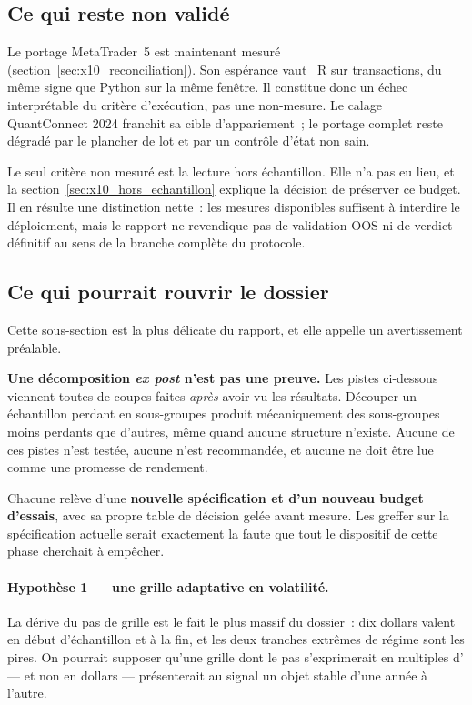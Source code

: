 \subsection{Ce qui reste non validé}

Le portage MetaTrader~5 est maintenant mesuré
(section~\ref{sec:x10_reconciliation}). Son espérance vaut
\XTenMTFiveExpectancyR{}~R sur \XTenMTFiveTrades{} transactions, du même signe
que Python sur la même fenêtre. Il constitue donc un échec interprétable du
critère d'exécution, pas une non-mesure. Le calage QuantConnect 2024 franchit
sa cible d'appariement~; le portage complet reste dégradé par le plancher de
lot et par un contrôle d'état non sain.

Le seul critère non mesuré est la lecture hors échantillon. Elle n'a pas eu
lieu, et la section~\ref{sec:x10_hors_echantillon} explique la décision de
préserver ce budget. Il en résulte une distinction nette~: les mesures
disponibles suffisent à interdire le déploiement, mais le rapport ne revendique
pas de validation OOS ni de verdict définitif au sens de la branche complète du
protocole.

\subsection{Ce qui pourrait rouvrir le dossier}

Cette sous-section est la plus délicate du rapport, et elle appelle un
avertissement préalable.

\begin{warningbox}
\textbf{Une décomposition \emph{ex post} n'est pas une preuve.} Les pistes
ci-dessous viennent toutes de coupes faites \emph{après} avoir vu les
résultats. Découper un échantillon perdant en sous-groupes produit
mécaniquement des sous-groupes moins perdants que d'autres, même quand aucune
structure n'existe. Aucune de ces pistes n'est testée, aucune n'est
recommandée, et aucune ne doit être lue comme une promesse de rendement.

Chacune relève d'une \textbf{nouvelle spécification et d'un nouveau budget
d'essais}, avec sa propre table de décision gelée avant mesure. Les greffer
sur la spécification actuelle serait exactement la faute que tout le
dispositif de cette phase cherchait à empêcher.
\end{warningbox}

\paragraph{Hypothèse 1 --- une grille adaptative en volatilité.}
La dérive du pas de grille est le fait le plus massif du dossier~: dix
dollars valent \XTenDollarsPerAtrFirst{}  en début d'échantillon et
\XTenDollarsPerAtrLast{} à la fin, et les deux tranches extrêmes de régime
sont les pires. On pourrait supposer qu'une grille dont le pas s'exprimerait
en multiples d' --- et non en dollars --- présenterait au signal un
objet stable d'une année à l'autre.

